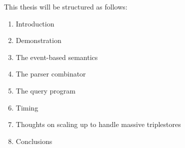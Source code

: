 \documentclass[../main.tex]{subfiles}
\begin{document}
This thesis will be structured as follows:

\begin{enumerate}
	\item Introduction
	\item Demonstration
	\item The event-based semantics
	\item The parser combinator
	\item The query program
	\item Timing
	\item Thoughts on scaling up to handle massive triplestores
	\item Conclusions
\end{enumerate}
\end{document}
